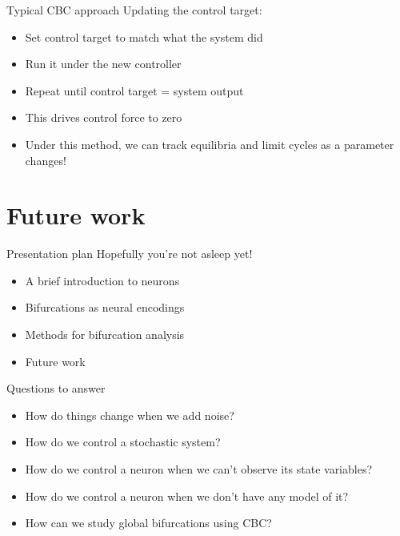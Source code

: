 \documentclass[presentation]{beamer}
\begin{document}
\begin{frame}[label={sec:org755195b}]{Typical CBC approach}
Updating the control target:

\begin{itemize}[<+->]
\item Set control target to match what the system did
\item Run it under the new controller
\item Repeat until control target = system output
\item This drives control force to zero
\item Under this method, we can track equilibria and limit cycles as a parameter changes!
\end{itemize}
\end{frame}


\section{Future work}
\label{sec:orgd4918d6}
\begin{frame}[label={sec:org7cbe0f4}]{Presentation plan}
Hopefully you're not asleep yet!
\begin{itemize}
\item A brief introduction to neurons
\item Bifurcations as neural encodings
\item Methods for bifurcation analysis
\item \color{bristolred} Future work
\end{itemize}
\end{frame}

\begin{frame}[label={sec:org5a523d3}]{Questions to answer}
\begin{itemize}
\item How do things change when we add noise?
\item How do we control a stochastic system?
\item How do we control a neuron when we can't observe its state variables?
\item How do we control a neuron when we don't have any model of it?
\item How can we study global bifurcations using CBC?
\end{itemize}
\end{frame}
\end{document}
